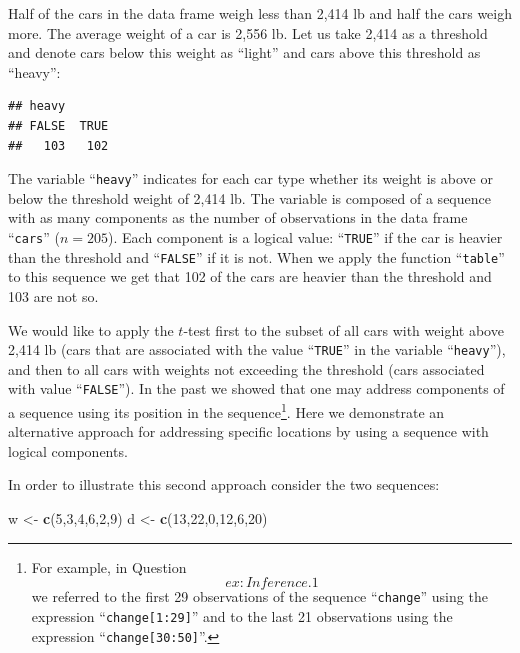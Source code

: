 \documentclass[]{krantz}
\makeatletter
\newenvironment{Shaded}{\begin{snugshade}}{\end{snugshade}}
\newcommand{\DecValTok}[1]{\textcolor[rgb]{0.00,0.00,0.81}{#1}}
\newcommand{\KeywordTok}[1]{\textcolor[rgb]{0.13,0.29,0.53}{\textbf{#1}}}
\newcommand{\NormalTok}[1]{#1}
\newcommand{\OperatorTok}[1]{\textcolor[rgb]{0.81,0.36,0.00}{\textbf{#1}}}
\newcommand{\StringTok}[1]{\textcolor[rgb]{0.31,0.60,0.02}{#1}}
\newenvironment{kframe}{%
\medskip{}
\setlength{\fboxsep}{.8em}
 \def\at@end@of@kframe{}%
 \ifinner\ifhmode%
  \def\at@end@of@kframe{\end{minipage}}%
  \begin{minipage}{\columnwidth}%
 \fi\fi%
 \def\FrameCommand##1{\hskip\@totalleftmargin \hskip-\fboxsep
 \colorbox{shadecolor}{##1}\hskip-\fboxsep
     \hskip-\linewidth \hskip-\@totalleftmargin \hskip\columnwidth}%
 \MakeFramed {\advance\hsize-\width
   \@totalleftmargin\z@ \linewidth\hsize
   \@setminipage}}%
 {\par\unskip\endMakeFramed%
 \at@end@of@kframe}
\renewenvironment{Shaded}{\begin{kframe}}{\end{kframe}}
\theoremstyle{definition}
\theoremstyle{definition}
\theoremstyle{definition}
\theoremstyle{remark}
\makeatother
\begin{document}
Half of the cars in the data frame weigh less than 2,414 lb and half the
cars weigh more. The average weight of a car is 2,556 lb. Let us take
2,414 as a threshold and denote cars below this weight as ``light'' and
cars above this threshold as ``heavy'':

\begin{Shaded}
\end{Shaded}

\begin{verbatim}
## heavy
## FALSE  TRUE 
##   103   102
\end{verbatim}

The variable ``\texttt{heavy}'' indicates for each car type whether its weight is
above or below the threshold weight of 2,414 lb. The variable is
composed of a sequence with as many components as the number of
observations in the data frame ``\texttt{cars}'' (\(n = 205\)). Each component is a
logical value: ``\texttt{TRUE}'' if the car is heavier than the threshold and
``\texttt{FALSE}'' if it is not. When we apply the function ``\texttt{table}'' to this
sequence we get that 102 of the cars are heavier than the threshold and
103 are not so.

We would like to apply the \(t\)-test first to the subset of all cars with
weight above 2,414 lb (cars that are associated with the value ``\texttt{TRUE}''
in the variable ``\texttt{heavy}''), and then to all cars with weights not
exceeding the threshold (cars associated with value ``\texttt{FALSE}''). In the
past we showed that one may address components of a sequence using its
position in the sequence\footnote{For example, in Question~\[ex:Inference.1\] we referred to the
  first 29 observations of the sequence ``\texttt{change}'' using the
  expression ``\texttt{change{[}1:29{]}}'' and to the last 21 observations using
  the expression ``\texttt{change{[}30:50{]}}''.}. Here we demonstrate an alternative
approach for addressing specific locations by using a sequence with
logical components.

In order to illustrate this second approach consider the two sequences:

\begin{Shaded}
\begin{Highlighting}[]
\NormalTok{w <-}\StringTok{ }\KeywordTok{c}\NormalTok{(}\DecValTok{5}\NormalTok{,}\DecValTok{3}\NormalTok{,}\DecValTok{4}\NormalTok{,}\DecValTok{6}\NormalTok{,}\DecValTok{2}\NormalTok{,}\DecValTok{9}\NormalTok{)}
\NormalTok{d <-}\StringTok{ }\KeywordTok{c}\NormalTok{(}\DecValTok{13}\NormalTok{,}\DecValTok{22}\NormalTok{,}\DecValTok{0}\NormalTok{,}\DecValTok{12}\NormalTok{,}\DecValTok{6}\NormalTok{,}\DecValTok{20}\NormalTok{)}
\end{Highlighting}
\end{Shaded}
\end{document}
